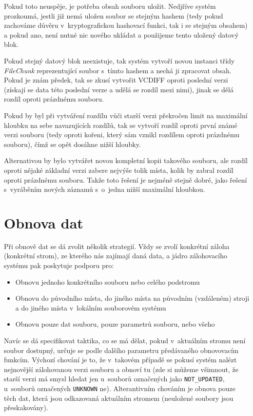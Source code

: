 Pokud toto neuspěje, je potřeba obsah souboru uložit. Nedjříve systém prozkoumá,
jestli již nemá uložen soubor se stejným hashem (tedy pokud zachováme důvěru
v~kryptografickou hashovací funkci, tak i se stejným obsahem) a pokud ano, není
nutné nic nového ukládat a použijeme tento uložený datový blok.

Pokud stejný datový blok neexistuje, tak systém vytvoří novou instanci třídy
{\it FileChunk} reprezentující soubor s~tímto hashem a nechá ji zpracovat obsah.
Pokud je znám předek, tak se zkusí vytvořit \gls{VCDIFF} oproti poslední verzi
(získají se data této poslední verze a udělá se rozdíl mezi nimi), jinak se dělá
rozdíl oproti prázdnému souboru.

Pokud by byl při vytváření rozdílu vůči starší verzi překročen limit na maximální
hloubku na sebe navazujících rozdílů, tak se vytvoří rozdíl oproti první známé
verzi souboru (tedy oproti kořeni, který sám vznikl rozdílem oproti prázdnému
souboru), čímž se opět dosáhne nižší hloubky.

Alternativou by bylo vytvářet novou kompletní kopii takového souboru, ale rozdíl
oproti nějaké základní verzi zabere nejvýše tolik místa, kolik by zabral rozdíl
oproti prázdnému souboru. Takže toto řešení je nejméně stejně dobré, jako řešení
s~vyráběním nových záznamů s~o~jedna nižší maximální hloubkou.

\section{Obnova dat}

Při obnově dat se dá zvolit několik strategií. Vždy se zvolí konkrétní záloha
(konkrétní strom), ze kterého nás zajímají daná data, a jádro zálohovacího
systému pak poskytuje podporu pro:
\begin{itemize}
	\item Obnovu jednoho konkrétního souboru nebo celého podstromu
	\item Obnovu do původního místa, do jiného místa na původním (vzdáleném)
	stroji a do jiného místa v~lokálním souborovém systému
	\item Obnovu pouze dat souboru, pouze parametrů souboru, nebo všeho
\end{itemize}

Navíc se dá specifikovat taktika, co se má dělat, pokud v~aktuálním stromu není
soubor dostupný, určuje se podle dalšího parametru předávaného obnovovacím
funkcím. Výchozí chování je to, že v~takovém případě se pokusí systém nalézt
nejnovější zálohovanou verzi souboru a obnoví tu (zde si můžeme všimnout, že
starší verzi má smysl hledat jen u~souborů označených jako
\texttt{NOT\_UPDATED}, u~souborů označených \texttt{UNKNOWN} ne). Alterantivním
chováním je obnova pouze těch dat, která jsou odkazovaná aktuálním stromem
(neuložené soubory jsou přeskakovány).

